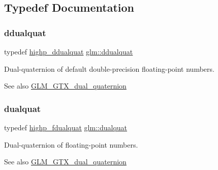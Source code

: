 \subsection{Typedef Documentation}
\mbox{\label{group__gtx__dual__quaternion_ga373431ffdd82d5c03c258217a9e1f1a6}} 
\subsubsection{\texorpdfstring{ddualquat}{ddualquat}}
{\footnotesize\ttfamily typedef \hyperlink{group__gtx__dual__quaternion_ga83e4c5d27c8b0a264a3f3aed24f3f84e}{highp\+\_\+ddualquat} \hyperlink{group__gtx__dual__quaternion_ga373431ffdd82d5c03c258217a9e1f1a6}{glm\+::ddualquat}}

Dual-\/quaternion of default double-\/precision floating-\/point numbers.

\begin{DoxySeeAlso}{See also}
\hyperlink{group__gtx__dual__quaternion}{G\+L\+M\+\_\+\+G\+T\+X\+\_\+dual\+\_\+quaternion} 
\end{DoxySeeAlso}
\mbox{\label{group__gtx__dual__quaternion_ga2f6227b5f9dc08a2e7682065a84b3aa9}} 
\subsubsection{\texorpdfstring{dualquat}{dualquat}}
{\footnotesize\ttfamily typedef \hyperlink{group__gtx__dual__quaternion_ga8c46d61c38b2b6d9c5091c667dd20fe8}{highp\+\_\+fdualquat} \hyperlink{group__gtx__dual__quaternion_ga2f6227b5f9dc08a2e7682065a84b3aa9}{glm\+::dualquat}}

Dual-\/quaternion of floating-\/point numbers.

\begin{DoxySeeAlso}{See also}
\hyperlink{group__gtx__dual__quaternion}{G\+L\+M\+\_\+\+G\+T\+X\+\_\+dual\+\_\+quaternion} 
\end{DoxySeeAlso}
\mbox{\label{group__gtx__dual__quaternion_ga436906129bc69ca5059555cafcbac9fd}} 
